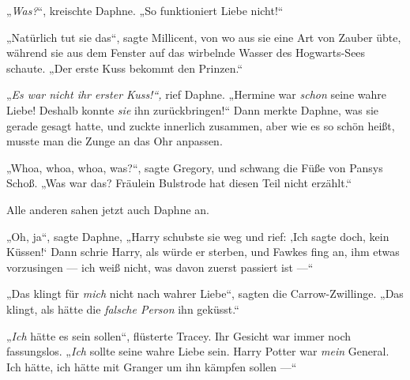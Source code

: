 „\emph{Was?}“, kreischte Daphne.
„So funktioniert Liebe nicht!“

„Natürlich tut sie das“, sagte Millicent, von wo aus sie eine Art von Zauber übte, während sie aus dem Fenster auf das wirbelnde Wasser des Hogwarts-Sees schaute.
„Der erste Kuss bekommt den Prinzen.“

„\emph{Es war nicht ihr erster Kuss!“,} rief Daphne.
„Hermine war \emph{schon} seine wahre Liebe! Deshalb konnte \emph{sie} ihn zurückbringen!“ Dann merkte Daphne, was sie gerade gesagt hatte, und zuckte innerlich zusammen, aber wie es so schön heißt, musste man die Zunge an das Ohr anpassen.

„Whoa, whoa, whoa, was?“, sagte Gregory, und schwang die Füße von Pansys Schoß.
„Was war das? Fräulein Bulstrode hat diesen Teil nicht erzählt.“

Alle anderen sahen jetzt auch Daphne an.

„Oh, ja“, sagte Daphne,
„Harry schubste sie weg und rief: ‚Ich sagte doch, kein Küssen!‘ Dann schrie Harry, als würde er sterben, und Fawkes fing an, ihm etwas vorzusingen — ich weiß nicht, was davon zuerst passiert ist —“

„Das klingt für \emph{mich} nicht nach wahrer Liebe“, sagten die Carrow-Zwillinge.
„Das klingt, als hätte die \emph{falsche Person} ihn geküsst.“

„\emph{Ich} hätte es sein sollen“, flüsterte Tracey. Ihr Gesicht war immer noch fassungslos.
„\emph{Ich} sollte seine wahre Liebe sein. Harry Potter war \emph{mein} General. Ich hätte, ich hätte mit Granger um ihn kämpfen sollen —“

